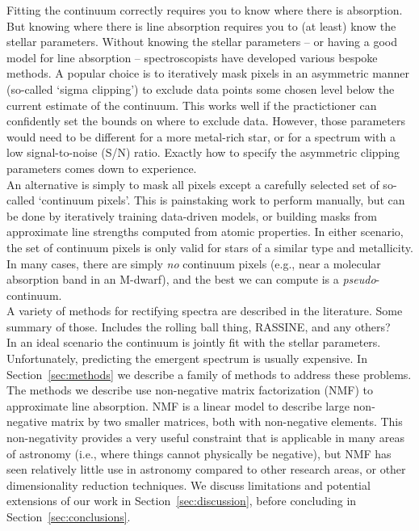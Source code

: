 \documentclass[modern]{aastex631}
\newcommand{\todo}[1]{\textcolor{tab:red}{#1}}
\begin{document}
Fitting the continuum correctly requires you to know where there is absorption. But knowing where there is line absorption requires you to (at least) know the stellar parameters. Without knowing the stellar parameters -- or having a good model for line absorption -- spectroscopists have developed various bespoke methods. A popular choice is to iteratively mask pixels in an asymmetric manner (so-called `sigma clipping') to exclude data points some chosen level below the current estimate of the continuum. This works well if the practictioner can confidently set the bounds on where to exclude data. However, those parameters would need to be different for a more metal-rich star, or for a spectrum with a low signal-to-noise (S/N) ratio. Exactly how to specify the asymmetric clipping parameters comes down to experience.\\

An alternative is simply to mask all pixels except a carefully selected set of so-called `continuum pixels'. This is painstaking work to perform manually, but can be done by iteratively training data-driven models, or building masks from approximate line strengths computed from atomic properties. In either scenario, the set of continuum pixels is only valid for stars of a similar type and metallicity. In many cases, there are simply \emph{no} continuum pixels (e.g., near a molecular absorption band in an M-dwarf), and the best we can compute is a \emph{pseudo}-continuum.\\

A variety of methods for rectifying spectra are described in the literature. \todo{Some summary of those. Includes the rolling ball thing, RASSINE, and any others?}\\


In an ideal scenario the continuum is jointly fit with the stellar parameters. Unfortunately, predicting the emergent spectrum is usually expensive. In Section~\ref{sec:methods} we describe a family of methods to address these problems.
The methods we describe use non-negative matrix factorization (NMF) to approximate line absorption. NMF is a linear model to describe large non-negative matrix by two smaller matrices, both with non-negative elements. This non-negativity provides a very useful constraint that is applicable in many areas of astronomy (i.e., where things cannot physically be negative), but NMF has seen relatively little use in astronomy compared to other research areas, or other dimensionality reduction techniques.
We discuss limitations and potential extensions of our work in Section~\ref{sec:discussion}, before concluding in Section~\ref{sec:conclusions}.\\
\end{document}
